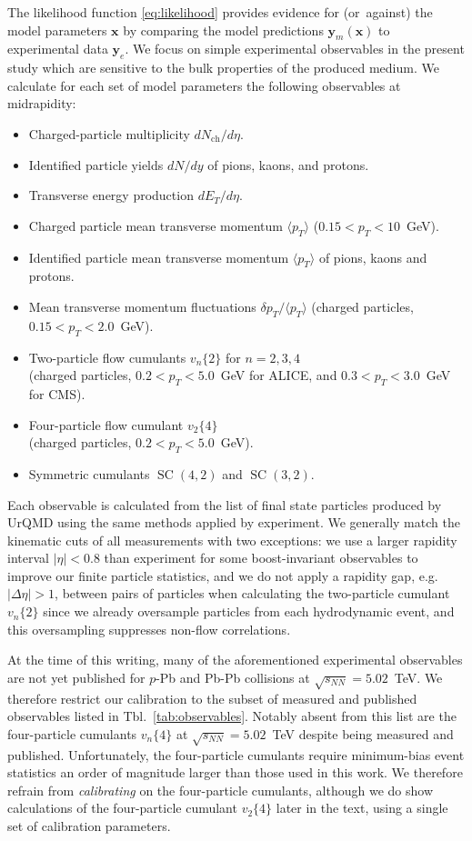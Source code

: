 \documentclass[aps,prc,reprint,amsmath,nofootinbib]{revtex4-1}
\newcommand{\sqrts}{\sqrt{s_{NN}}}
\newcommand{\nch}{N_\text{ch}}
\newcommand{\vnk}[2]{v_#1\{#2\}}
\newcommand{\x}{\mathbf x}
\newcommand{\y}{\mathbf y}
\DeclareMathOperator{\SC}{SC}
\begin{document}
The likelihood function \eqref{eq:likelihood} provides evidence for \mbox{(or against)} the model parameters $\x$ by comparing the model predictions $\y_m(\x)$ to experimental data $\y_e$.
We focus on simple experimental observables in the present study which are sensitive to the bulk properties of the produced medium.
We calculate for each set of model parameters the following observables at midrapidity:
\begin{itemize}[leftmargin=1\parindent, itemsep=0pt]
  \item Charged-particle multiplicity $d\nch/d\eta$.
  \item Identified particle yields $dN/dy$ of pions, kaons, and protons.
  \item Transverse energy production $dE_T/d\eta$.
  \item Charged particle mean transverse momentum $\langle p_T \rangle$ ($0.15 < p_T < 10$~GeV).
  \item Identified particle mean transverse momentum $\langle p_T \rangle$ of pions, kaons and protons.
  \item Mean transverse momentum fluctuations $\delta p_T / \langle p_T \rangle$ (charged particles, $0.15 < p_T < 2.0$~GeV).
  \item Two-particle flow cumulants $\vnk{n}{2}$ for $n=2,3,4$\\ (charged particles, $0.2 < p_T < 5.0$~GeV for ALICE, and $0.3 < p_T < 3.0$~GeV for CMS).
  \item Four-particle flow cumulant $\vnk{2}{4}$ \\(charged particles, $0.2 < p_T < 5.0$~GeV).
  \item Symmetric cumulants $\SC(4, 2)$ and $\SC(3,2)$.
\end{itemize}
Each observable is calculated from the list of final state particles produced by UrQMD using the same methods applied by experiment.
We generally match the kinematic cuts of all measurements with two exceptions: we use a larger rapidity interval $|\eta| < 0.8$ than experiment for some boost-invariant observables to improve our finite particle statistics, and we do not apply a rapidity gap, e.g.\ $|\Delta \eta| > 1$, between pairs of particles when calculating the two-particle cumulant $\vnk{n}{2}$ since we already oversample particles from each hydrodynamic event, and this oversampling suppresses non-flow correlations.

At the time of this writing, many of the aforementioned experimental observables are not yet published for $p$-Pb and Pb-Pb collisions at $\sqrts=5.02$~TeV.
We therefore restrict our calibration to the subset of measured and published observables listed in Tbl.~\ref{tab:observables}.
Notably absent from this list are the four-particle cumulants $\vnk{n}{4}$ at $\sqrts=5.02$~TeV despite being measured and published.
Unfortunately, the four-particle cumulants require minimum-bias event statistics an order of magnitude larger than those used in this work.
We therefore refrain from \emph{calibrating} on the four-particle cumulants, although we do show calculations of the four-particle cumulant $\vnk{2}{4}$ later in the text, using a single set of calibration parameters.
\end{document}
